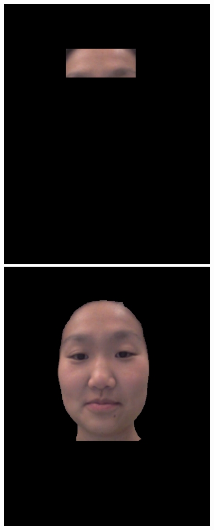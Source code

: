 \documentclass[10pt,twocolumn,letterpaper]{article}
\begin{document}
\begin{figure}
\begin{center}
	\includegraphics[scale=0.2]{figures/jane_forehead}
	\includegraphics[scale=0.2]{figures/jane_segment}

\end{center}
\end{figure}
\end{document}
